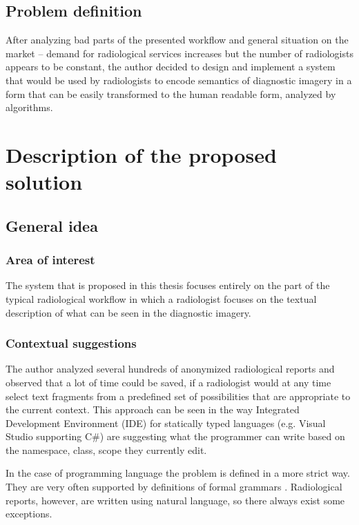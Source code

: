 \documentclass[12pt, twoside, openany]{report}
\theoremstyle{definition}
\begin{document}
\section{Problem definition}

After analyzing bad parts of the presented workflow and general situation on the market -- demand for radiological services increases but the number of radiologists appears to be constant, the author decided to design and implement a system that would be used by radiologists to encode semantics of diagnostic imagery in a form that can be easily transformed to the human readable form, analyzed by algorithms. 





\chapter{Description of the proposed solution}
\section{General idea}
\subsection{Area of interest}
The system that is proposed in this thesis focuses entirely on the part of the typical radiological workflow in which a radiologist focuses on the textual description of what can be seen in the diagnostic imagery.
\subsection{Contextual suggestions}
The author analyzed several hundreds of anonymized radiological reports and observed that a lot of time could be saved, if a radiologist would at any time select text fragments from a predefined set of possibilities that are appropriate to the current context. This approach can be seen in the way Integrated Development Environment (IDE) for statically typed languages (e.g. Visual Studio supporting C\#) are suggesting what the programmer can write based on the namespace, class, scope they currently edit.

In the case of programming language the problem is defined in a more strict way. They are very often supported by definitions of formal grammars \cite{csharp-spec}. Radiological reports, however, are written using  natural language, so there always exist some exceptions.
\end{document}
